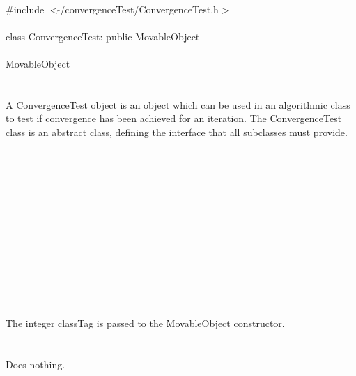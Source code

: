 
   \\
\indent \#include $<\tilde{}$/convergenceTest/ConvergenceTest.h$>$  \\

  \\
\indent class ConvergenceTest: public MovableObject  \\

 \\
\indent MovableObject \\
\indent{} \\

  \\
\indent A ConvergenceTest object is an object which can be used in an
algorithmic class to test if convergence has been achieved for an 
iteration. The ConvergenceTest class is an abstract class, defining
the interface that all subclasses must provide. \\

 \\
\indent{}  \\ 
\indent{}  \\ \\
\indent{}  \\ 
\indent{} \\ \\
\indent{}  \\ 
\indent{} \\
\indent{} \\
\indent{} \\

  \\
  \\
The integer \p classTag is passed to the MovableObject constructor. \\

 \\
 \\ 
Does nothing. \\

